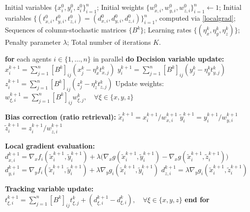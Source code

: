 \documentclass{article}
\theoremstyle{plain}
\theoremstyle{definition}
\theoremstyle{remark}
\begin{document}
\begin{algorithm}[h]
    \caption{PushSum\_FAB Algorithm}
    \label{alg:pushsum_fab}
    \begin{algorithmic}[1]
         Initial variables $\{x_{i}^{0}, y_{i}^{0}, z_{i}^{0}\}_{i=1}^n$;
        Initial weights $\{w_{x,i}^{0}, w_{y,i}^{0}, w_{z,i}^{0}\}_{i=1}^n \leftarrow 1$;
        Initial variables $\{(t_{x,i}^{0}, t_{y,i}^{0}, t_{z,i}^{0})=(d_{x,i}^{0}, d_{y,i}^{0}, d_{z,i}^{0})\}_{i=1}^n$, computed via \eqref{localgrad}; 
        Sequences of  column-stochastic matrices $\{B^{k}\}$; 
        Learning rates $\{(\eta_{x}^{k}, \eta_{y}^{k}, \eta_{z}^{k})\}$; Penalty parameter $\lambda$; Total number of iterations $K$.
        
        \STATE \textbf{for} each agents $i \in \{1,\ldots,n\}$ in parallel \textbf{do}
            \STATE \quad \textbf{Decision variable update:}
            \STATE \quad \quad \quad $x_{i}^{k+1} = \sum_{j=1}^n [B^k]_{ij} (x_{j}^{k} - \eta_{x}^{k} t_{x,j}^{k})$
            \STATE \quad \quad \quad $y_{i}^{k+1} = \sum_{j=1}^n [B^k]_{ij} (y_{j}^{k} - \eta_{y}^{k} t_{y,j}^{k})$
            \STATE \quad \quad \quad $z_{i}^{k+1} = \sum_{j=1}^n [B^k]_{ij} (z_{j}^{k} - \eta_{z}^{k} t_{z,j}^{k})$
            \STATE \quad \quad \quad Update weights:
            \STATE \quad \quad \quad $w_{\xi, i}^{k+1} = \sum_{j=1}^n [B^k]_{ij} w_{\xi, j}^{k}, \quad \forall \xi \in \{x, y, z\}$
            
            \STATE \quad  \textbf{Bias correction (ratio retrieval):}
            \STATE \quad \quad \quad $\tilde{x}_{i}^{k+1} = x_{i}^{k+1} / w_{x,i}^{k+1}$
            \STATE \quad \quad \quad $\tilde{y}_{i}^{k+1} = y_{i}^{k+1} / w_{y,i}^{k+1}$
            \STATE \quad \quad \quad $\tilde{z}_{i}^{k+1} = z_{i}^{k+1} / w_{z,i}^{k+1}$
            
            \STATE \quad \textbf{Local gradient evaluation:}
            \STATE \quad \quad \quad $d_{x,i}^{k+1} = \nabla_x  f_i(\tilde{x}_i^{k+1}, \tilde{y}_i^{k+1}) + \lambda\big(  \nabla_x  g(\tilde{x}_i^{k+1},\tilde{y}_i^{k+1})- \nabla_x g(\tilde{x}_i^{k+1},\tilde{z}_i^{k+1})\big)$
            \STATE \quad \quad \quad $d_{y,i}^{k+1} = \nabla_y f_i(\tilde{x}_i^{k+1}, \tilde{y}_i^{k+1}) + \lambda \nabla_y g_i(\tilde{x}_i^{k+1},\tilde{y}_i^{k+1})$
            \STATE \quad \quad \quad $d_{z,i}^{k+1} = \lambda \nabla_y g_i(\tilde{x}_i^{k+1},\tilde{z}_i^{k+1})$
            
            \STATE \quad \textbf{Tracking variable update:}
            \STATE \quad \quad \quad $t_{\xi, i}^{k+1} = \sum_{j=1}^n [B^k]_{ij} t_{\xi, j}^{k} + (d_{\xi, i}^{k+1} - d_{\xi, i}^{k}), \quad \forall \xi \in \{x, y, z\}$
            \STATE \textbf{end for}
        \ENDFOR
    \end{algorithmic}
\end{algorithm}
\end{document}
